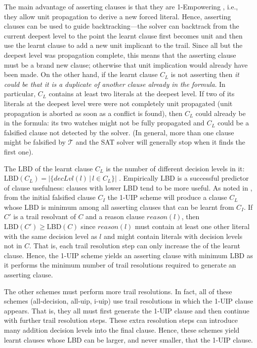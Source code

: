 \documentclass[runningheads]{llncs}
\newcommand{\sat}{SAT\xspace}
\newcommand{\LBD}{\text{LBD}\xspace}
\newcommand{\trail}{\ensuremath{\mathcal{T}}}
\newcommand{\dlevel}[1]{\ensuremath{\mathit{decLvl}(#1)}}
\newcommand{\reason}[1]{\ensuremath{\mathit{reason}(#1)}}
\begin{document}
The main advantage of asserting clauses is that they are 1-Empowering
\cite{DBLP:journals/ai/PipatsrisawatD11}, i.e., they allow unit
propagation to derive a new forced literal. Hence, asserting clauses
can be used to guide backtracking---the solver can backtrack from the
current deepest level to the point the learnt clause first becomes
unit and then use the learnt clause to add a new unit implicant to the
trail. Since all but the deepest level was propagation complete, this
means that the asserting clause must be a brand new clause; otherwise
that unit implication would already have been made. On the other hand,
if the learnt clause $C_L$ is not asserting then \emph{it could be
  that it is a duplicate of another clause already in the formula}. In
particular, $C_L$ contains at least two literals at the deepest level.
If two of its literals at the deepest level were were not completely
unit propagated (unit propagation is aborted as soon as a conflict is
found), then $C_L$ could already be in the formula: its two watches
might not be fully propagated and $C_L$ could be a falsified clause
not detected by the solver. (In general, more than one clause might be
falsified by $\trail$ and the \sat solver will generally stop when it
finds the first one).

The LBD of the learnt clause $C_L$ is the number of different decision
levels in it:
$\LBD(C_L)=\left|\big\{\dlevel{l}\,|\,l \in C_L\big\}\right|$
\cite{DBLP:conf/ijcai/AudemardS09}. Empirically LBD is a successful
predictor of clause usefulness: clauses with lower LBD tend to be more
useful. As noted in \cite{DBLP:conf/ijcai/AudemardS09}, from the
initial falsified clause $C_I$ the 1-UIP scheme will produce a clause
$C_L$ whose LBD is minimum among all asserting clauses that can be
learnt from $C_I$. If $C'$ is a trail resolvant of $C$ and a reason
clause $\reason{l}$, then $\LBD(C') \geq \LBD(C)$ since $\reason{l}$
must contain at least one other literal with the same decision level
as $l$ and might contain literals with decision levels not in
$C$. That is, each trail resolution step can only increase the \LBD of
the learnt clause. Hence, the 1-UIP scheme yields an asserting clause
with minimum LBD as it performs the minimum number of trail resolutions
required to generate an asserting clause.

The other schemes must perform more trail resolutions. In fact, all of
these schemes (all-decision, all-uip, i-uip) use trail resolutions in
which the 1-UIP clause appears. That is, they all must first generate
the 1-UIP clause and then continue with further trail resolution
steps. These extra resolution steps can introduce many addition
decision levels into the final clause. Hence, these schemes yield
learnt clauses whose LBD can be larger, and never smaller, that the
1-UIP clause.
\end{document}
